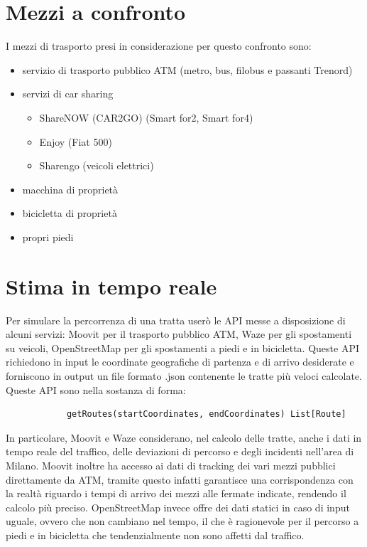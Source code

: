 \documentclass[a4paper]{report}
\begin{document}
	\section{Mezzi a confronto}
	{\large
		I mezzi di trasporto presi in considerazione per questo confronto sono:
		\begin{itemize}
			\item servizio di trasporto pubblico ATM (metro, bus, filobus e passanti Trenord)
			\item servizi di car sharing
			\begin{itemize}
				\item ShareNOW (CAR2GO) (Smart for2, Smart for4)
				\item Enjoy (Fiat 500)
				\item Sharengo (veicoli elettrici)
			\end{itemize}
			\item macchina di proprietà
			\item bicicletta di proprietà
			\item propri piedi
		\end{itemize}
	}
	
	\section{Stima in tempo reale}
	{\large
		Per simulare la percorrenza di una tratta userò le API messe a disposizione di alcuni servizi: Moovit per il trasporto pubblico ATM, Waze per gli spostamenti su veicoli, OpenStreetMap per gli spostamenti a piedi e in bicicletta. Queste API richiedono in input le coordinate geografiche di partenza e di arrivo desiderate e forniscono in output un file formato .json contenente le tratte più veloci calcolate. Queste API sono nella sostanza di forma:
		\begin{verbatim}
			getRoutes(startCoordinates, endCoordinates) List[Route]
		\end{verbatim}
	}

	{\large
		In particolare, Moovit e Waze considerano, nel calcolo delle tratte, anche i dati in tempo reale del traffico, delle deviazioni di percorso e degli incidenti nell'area di Milano. Moovit inoltre ha accesso ai dati di tracking dei vari mezzi pubblici direttamente da ATM, tramite questo infatti garantisce una corrispondenza con la realtà riguardo i tempi di arrivo dei mezzi alle fermate indicate, rendendo il calcolo più preciso. OpenStreetMap invece offre dei dati statici in caso di input uguale, ovvero che non cambiano nel tempo, il che è ragionevole per il percorso a piedi e in bicicletta che tendenzialmente non sono affetti dal traffico.
	}
\end{document}
